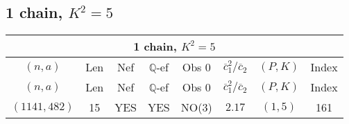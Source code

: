 \subsection{1 chain, $K^2 = 5$}
\begin{longtable}{|c|c|c|c|c|c|c|c|}
\hline
\multicolumn{8}{|c|}{1 chain, $K^2 = 5$}\\
\hline
$(n,a)$ & Len & Nef & $\mathbb Q$-ef & Obs 0 & $\overline c_1^2 / \overline c_2$ & $(P,K)$ & Index\\
\hline
\endfirsthead

\hline
$(n,a)$ & Len & Nef & $\mathbb Q$-ef & Obs 0 & $\overline c_1^2 / \overline c_2$ & $(P,K)$ & Index\\
\hline
\endhead
\hline
\endfoot

$(1141,482)$ & 15 & YES & YES & NO(3) & $2.17$ & $(1,5)$ & 161
\end{longtable}
